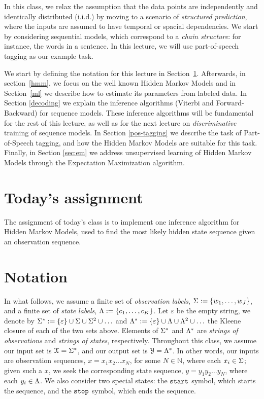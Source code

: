 

In this class, we relax the assumption that
the data points are independently and identically distributed (i.i.d.) 
by moving to a scenario of \emph{structured prediction}, where the inputs are assumed to have
temporal or spacial dependencies. We start by 
considering sequential models, which correspond to a \emph{chain structure}: for instance,
the words in a sentence. In this lecture, we will use part-of-speech
tagging as our example task.  

We start by defining the notation for this lecture in Section~\ref{notation}.
Afterwards, in section~\ref{hmm}, we focus on the well known Hidden Markov Models and in Section~\ref{ml} we describe how to estimate its parameters from labeled data. In Section \ref{decoding} we explain the inference
algorithms (Viterbi and Forward-Backward) for sequence models. These
inference algorithms will be fundamental for the rest of this lecture,
as well as for the next lecture on \emph{discriminative} training of sequence
models. In Section \ref{pos-tagging} we describe the task of 
Part-of-Speech tagging, and how the Hidden Markov Models are suitable for this task. 
Finally, in Section \ref{sec:em} we 
address unsupervised learning of Hidden Markov Models through the Expectation Maximization
algorithm.

\section*{Today's assignment}

The assignment of today's class is to implement one inference algorithm for Hidden Markov Models, used to find the most likely hidden state sequence given an observation sequence.

\section{Notation}\label{notation}

In what follows, 
we assume a finite set of \emph{observation labels}, 
$\Sigma := \{w_1,\ldots,w_J\}$,
and a finite set of \emph{state labels}, 
$\Lambda := \{c_1,\ldots, c_K\}$.
Let $\varepsilon$ be the empty string, 
we denote by 
$\Sigma^* := \{\varepsilon\} \cup \Sigma \cup \Sigma^2 \cup \ldots$ and 
$\Lambda^* := \{\varepsilon\} \cup \Lambda \cup \Lambda^2  \cup \ldots$ the Kleene closure 
of each of the two sets above. 
Elements of $\Sigma^*$ and $\Lambda^*$ 
are \emph{strings of observations} and \emph{strings of states}, 
respectively. 
Throughout this class, we 
assume our input set is $\mathcal{X} = \Sigma^*$, 
and our output set is $\mathcal{Y} = \Lambda^*$. 
In other words, 
our inputs are observation sequences, 
$x = x_1 x_2 \ldots x_N$, 
for some $N \in \mathbb{N}$, where each $x_i \in \Sigma$;
given such a $x$, we seek 
the corresponding state sequence, 
$y = y_1 y_2 \ldots y_N$, 
where each $y_i \in \Lambda$. We also consider two special states: the ${\tt start}$ symbol,
which starts the sequence, and 
the ${\tt stop}$ symbol, which ends the sequence. 

